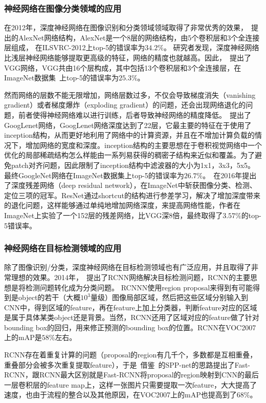\subsubsection{神经网络在图像分类领域的应用}
在2012年，深度神经网络在图像识别和分类领域领域取得了非常优秀的效果，~\citet{krizhevsky2012imagenet}提出的AlexNet网络结构，AlexNet是一个8层的网络结构，由5个卷积层和3个全连接层组成，
在ILSVRC-2012上top-5的错误率为$34.2\%$。 研究者发现，深度神经网络比浅层神经网络能够提取更高级的特征，网络的精度也就越高。因此，~\citet{simonyan2014very}提出了VGG网络，VGG共由16个层构成，其中包括13个卷积层和3个全连接层，在ImageNet数据集~\cite{deng2009imagenet}上top-5的错误率为$25.3\%$。

然而网络的层数不能无限增加，网络层数过多，不仅会导致梯度消失（vanishing gradient）或者梯度爆炸（exploding gradient）的问题，还会出现网络退化的问题，前者使得神经网络难以进行训练，后者导致神经网络的精度降低。~\citet{szegedy2015going}提出了GoogLenet网络，GoogLenet网络深度达到了22层，它最主要的特征在于使用了inception结构，从而更好地利用了网络中的计算资源，并且在不增加计算负载的情况下，增加网络的宽度和深度。inception结构的主要思想在于卷积视觉网络中一个优化的局部稀疏结构怎么样能由一系列易获得的稠密子结构来近似和覆盖。为了避免patch对齐问题，因此限制了inception结构中滤波器的大小为1x1，3x3，5x5。最终GoogleNet网络在ImageNet数据集上top-5的错误率为$26.7\%$。~\citet{he2016deep}在2016年提出了深度残差网络（deep residual network），在ImageNet中斩获图像分类、检测、定位三项的冠军。ResNet通过shortcut的结构进行参差学习，解决了增加深度带来的退化问题，这样能够通过单纯地增加网络深度，来提高网络性能，作者在ImageNet上实验了一个152层的残差网络，比VGG深8倍，最终取得了$3.57\%$的top-5错误率。

\subsubsection{神经网络在目标检测领域的应用}
除了图像识别/分类，深度神经网络在目标检测领域也有广泛应用，并且取得了非常理想的效果。2014年，~\citet{girshick2014rich}提出了RCNN网络解决目标检测问题，RCNN的主要思想是将检测问题转化成为分类问题。
RCNNN使用region proposal来得到有可能得到是object的若干（大概$10^3$量级）图像局部区域，然后把这些区域分别输入到CNN中，得到区域的feature，再在feature上加上分类器，判断feature对应的区域是属于具体某类object还是背景。当然，RCNN还用了区域对应的feature做了针对bounding box的回归，用来修正预测的bounding box的位置。RCNN在VOC2007上的mAP是$58\%$左右。

RCNN存在着重复计算的问题（proposal的region有几千个，多数都是互相重叠，重叠部分会被多次重复提取feature），于是~\citet{girshick2015fast}借鉴~\citet{he2014spatial}的SPP-net的思路提出了Fast-RCNN，跟RCNN最大区别就是Fast-RCNN将proposal的region映射到CNN的最后一层卷积层的feature map上，这样一张图片只需要提取一次feature，大大提高了速度，也由于流程的整合以及其他原因，在VOC2007上的mAP也提高到了$68\%$。


